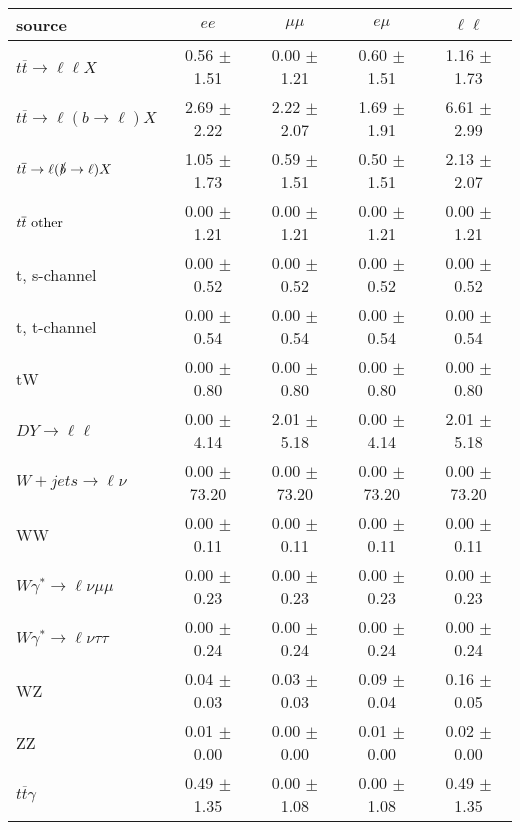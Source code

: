 \begin{tabular}{l|cccc} \hline\hline
source & $ee$ & $\mu\mu$ & $e\mu$ & $\ell\ell $ \\
\hline
$t\overline{t} \rightarrow \ell \ell X$ &  0.56 $\pm$  1.51 &  0.00 $\pm$  1.21 &  0.60 $\pm$  1.51 &  1.16 $\pm$  1.73 \\
$t\overline{t} \rightarrow \ell (b \rightarrow \ell) X$ &  2.69 $\pm$  2.22 &  2.22 $\pm$  2.07 &  1.69 $\pm$  1.91 &  6.61 $\pm$  2.99 \\
$t\overline{t} \rightarrow \ell (\slashed b \rightarrow \ell) X$ &  1.05 $\pm$  1.73 &  0.59 $\pm$  1.51 &  0.50 $\pm$  1.51 &  2.13 $\pm$  2.07 \\
        $t\overline{t}\ \rm{other}$ &  0.00 $\pm$  1.21 &  0.00 $\pm$  1.21 &  0.00 $\pm$  1.21 &  0.00 $\pm$  1.21 \\
\hline
                       t, s-channel &  0.00 $\pm$  0.52 &  0.00 $\pm$  0.52 &  0.00 $\pm$  0.52 &  0.00 $\pm$  0.52 \\
                       t, t-channel &  0.00 $\pm$  0.54 &  0.00 $\pm$  0.54 &  0.00 $\pm$  0.54 &  0.00 $\pm$  0.54 \\
                                 tW &  0.00 $\pm$  0.80 &  0.00 $\pm$  0.80 &  0.00 $\pm$  0.80 &  0.00 $\pm$  0.80 \\
\hline
         $DY \rightarrow \ell \ell$ &  0.00 $\pm$  4.14 &  2.01 $\pm$  5.18 &  0.00 $\pm$  4.14 &  2.01 $\pm$  5.18 \\
      $W+jets \rightarrow \ell \nu$ &  0.00 $\pm$ 73.20 &  0.00 $\pm$ 73.20 &  0.00 $\pm$ 73.20 &  0.00 $\pm$ 73.20 \\
                                 WW &  0.00 $\pm$  0.11 &  0.00 $\pm$  0.11 &  0.00 $\pm$  0.11 &  0.00 $\pm$  0.11 \\
\hline
$W\gamma^{*} \rightarrow \ell \nu \mu\mu$ &  0.00 $\pm$  0.23 &  0.00 $\pm$  0.23 &  0.00 $\pm$  0.23 &  0.00 $\pm$  0.23 \\
$W\gamma^{*} \rightarrow \ell \nu \tau\tau$ &  0.00 $\pm$  0.24 &  0.00 $\pm$  0.24 &  0.00 $\pm$  0.24 &  0.00 $\pm$  0.24 \\
                                 WZ &  0.04 $\pm$  0.03 &  0.03 $\pm$  0.03 &  0.09 $\pm$  0.04 &  0.16 $\pm$  0.05 \\
                                 ZZ &  0.01 $\pm$  0.00 &  0.00 $\pm$  0.00 &  0.01 $\pm$  0.00 &  0.02 $\pm$  0.00 \\
\hline
              $t\overline{t}\gamma$ &  0.49 $\pm$  1.35 &  0.00 $\pm$  1.08 &  0.00 $\pm$  1.08 &  0.49 $\pm$  1.35 \\

\end{tabular}
